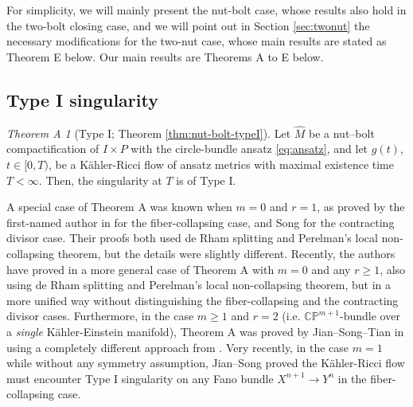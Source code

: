 \documentclass[11pt]{amsart}
\theoremstyle{plain}
\numberwithin{equation}{section}
\theoremstyle{definition}
\theoremstyle{remark}
\newtheorem*{thmA}{Theorem A}
\begin{document}
For simplicity, we will mainly present the nut-bolt case, whose results also hold in the two-bolt closing case, and we will point out in Section \ref{sec:twonut} the necessary modifications for the two-nut case, whose main results are stated as Theorem E below. Our main results are Theorems A to E below.

\subsection{Type I singularity}

\begin{thmA}[Type I; Theorem \ref{thm:nut-bolt-typeI}]
Let $\widehat{M}$ be a nut--bolt compactification of $I \times P$ with the circle-bundle ansatz \eqref{eq:ansatz}, and let $g ( t )$, $t \in [ 0, T )$, be a K\"ahler-Ricci flow of ansatz metrics with maximal existence time $T < \infty$. Then, the singularity at $T$ is of Type I.
\end{thmA}

A special case of Theorem A was known when $m = 0$ and $r = 1$, as proved by the first-named author in \cite{F} for the fiber-collapsing case, and Song \cite{S} for the contracting divisor case. Their proofs both used de Rham splitting and Perelman's local non-collapsing theorem, but the details were slightly different. Recently, the authors have proved in \cite{FT} a more general case of Theorem A with $m = 0$ and any $r \geq 1$, also using de Rham splitting and Perelman's local non-collapsing theorem, but in a more unified way without distinguishing the fiber-collapsing and the contracting divisor cases. Furthermore, in the case $m \geq 1$ and $r = 2$ (i.e. $\mathbb{CP}^{m+1}$-bundle over a \emph{single} K\"ahler-Einstein manifold), Theorem A was proved by Jian--Song--Tian in \cite{JST} using a completely different approach from \cite{F, S, FT}. Very recently, in the case $m = 1$ while without any symmetry assumption, Jian--Song \cite{JS26} proved the K\"ahler-Ricci flow must encounter Type I singularity on any Fano bundle $X^{n+1} \to Y^n$ in the fiber-collapsing case.
\end{document}
